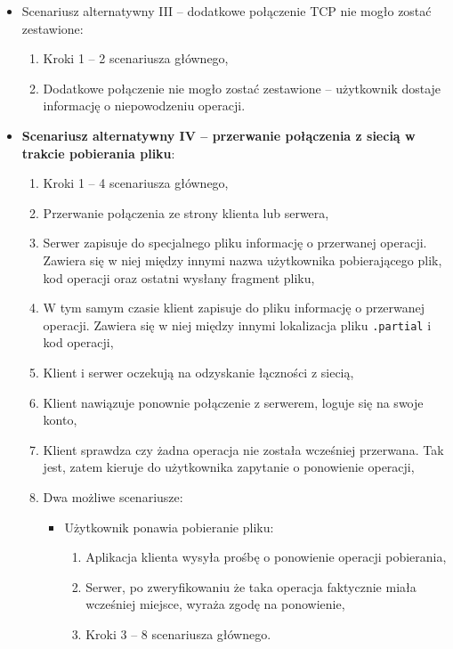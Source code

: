 \documentclass[10pt,a4paper]{article}
\begin{document}
\begin{itemize}
    \item Scenariusz alternatywny III -- dodatkowe połączenie TCP nie mogło zostać zestawione:
    \begin{enumerate}
        \item Kroki 1 -- 2 scenariusza głównego,
        \item Dodatkowe połączenie nie mogło zostać zestawione -- użytkownik dostaje informację o niepowodzeniu operacji.
    \end{enumerate}

    \item \textbf{Scenariusz alternatywny IV -- przerwanie połączenia z siecią w trakcie pobierania pliku}:
    \begin{enumerate}
        \item Kroki 1 -- 4 scenariusza głównego,
        \item Przerwanie połączenia ze strony klienta lub serwera,
        \item Serwer zapisuje do specjalnego pliku informację o przerwanej operacji. Zawiera się w niej między innymi nazwa użytkownika pobierającego plik, kod operacji oraz ostatni wysłany fragment pliku,
        \item W tym samym czasie klient zapisuje do pliku informację o przerwanej operacji. Zawiera się w niej między innymi lokalizacja pliku \texttt{.partial} i kod operacji,
        \item Klient i serwer oczekują na odzyskanie łączności z siecią,
        \item Klient nawiązuje ponownie połączenie z serwerem, loguje się na swoje konto,
        \item Klient sprawdza czy żadna operacja nie została wcześniej przerwana. Tak jest, zatem kieruje do użytkownika zapytanie o ponowienie operacji,
        \item Dwa możliwe scenariusze:
        \begin{itemize}
            \item Użytkownik ponawia pobieranie pliku:
            \begin{enumerate}
                \item Aplikacja klienta wysyła prośbę o ponowienie operacji pobierania,
                \item Serwer, po zweryfikowaniu że taka operacja faktycznie miała wcześniej miejsce, wyraża zgodę na ponowienie,
                \item Kroki 3 -- 8 scenariusza głównego.
            \end{enumerate}


\end{itemize}
\end{enumerate}
\end{itemize}
\end{document}
